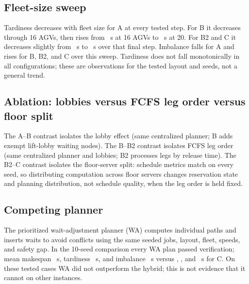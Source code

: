 \subsection{Fleet-size sweep}
Tardiness decreases with fleet size for A at every tested step. For B it decreases through 16 AGVs, then rises from \FleetTardBSixteen~s at 16 AGVs to \FleetTardBTwenty~s at 20. For B2 and C it decreases slightly from \FleetTardBtwoSixteen~s to \FleetTardBtwoTwenty~s over that final step. Imbalance falls for A and rises for B, B2, and C over this sweep. Tardiness does not fall monotonically in all configurations; these are observations for the tested layout and seeds, not a general trend.

\subsection{Ablation: lobbies versus FCFS leg order versus floor split}
The A--B contrast isolates the lobby effect (same centralized planner; B adds exempt lift-lobby waiting nodes). The B--B2 contrast isolates FCFS leg order (same centralized planner and lobbies; B2 processes legs by release time). The B2--C contrast isolates the floor-server split: schedule metrics match on every seed, so distributing computation across floor servers changes reservation state and planning distribution, not schedule quality, when the leg order is held fixed.

\subsection{Competing planner}
The prioritized wait-adjustment planner (WA) computes individual paths and inserts waits to avoid conflicts using the same seeded jobs, layout, fleet, speeds, and safety gap. In the 10-seed comparison every WA plan passed verification; mean makespan \WAMakespan~s, tardiness \WATardiness~s, and imbalance \WAImbalance~s versus \MakespanC, \TardinessC, and \ImbalanceC~s for C. On these tested cases WA did not outperform the hybrid; this is not evidence that it cannot on other instances.
